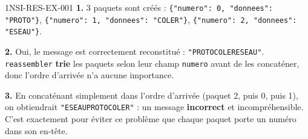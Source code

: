 \begin{corrige}{1NSI-RES-EX-001}
\textbf{1.} $3$ paquets sont créés : \lstinline|{"numero": 0, "donnees": "PROTO"}|,
\lstinline|{"numero": 1, "donnees": "COLER"}|, \lstinline|{"numero": 2, "donnees": "ESEAU"}|.

\textbf{2.} Oui, le message est correctement reconstitué :
\lstinline{"PROTOCOLERESEAU"}. \lstinline{reassembler} \textbf{trie} les paquets selon leur
champ \lstinline{numero} avant de les concaténer, donc l'ordre d'arrivée n'a aucune
importance.

\textbf{3.} En concaténant simplement dans l'ordre d'arrivée (paquet 2, puis 0, puis 1),
on obtiendrait \lstinline{"ESEAUPROTOCOLER"} : un message \textbf{incorrect} et
incompréhensible. C'est exactement pour éviter ce problème que chaque paquet porte un
numéro dans son en-tête.
\end{corrige}
